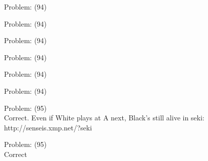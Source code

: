 \documentclass[11pt]{article}
\begin{document}
\begin{minipage}[t]{0.5\textwidth}
  {\centering
  
Problem: (94)\\
  }
\end{minipage}
\begin{minipage}[t]{0.5\textwidth}
  {\centering
  
Problem: (94)\\
  }
\end{minipage}
\begin{minipage}[t]{0.5\textwidth}
  {\centering
  
Problem: (94)\\
  }
\end{minipage}
\begin{minipage}[t]{0.5\textwidth}
  {\centering
  
Problem: (94)\\
  }
\end{minipage}
\begin{minipage}[t]{0.5\textwidth}
  {\centering
  
Problem: (94)\\
  }
\end{minipage}
\begin{minipage}[t]{0.5\textwidth}
  {\centering
  
Problem: (94)\\
  }
\end{minipage}
\begin{minipage}[t]{0.5\textwidth}
  {\centering
  
Problem: (95)\\
Correct. Even if White plays at A next, Black's still alive in seki: http://senseis.xmp.net/?seki\\
  }
\end{minipage}
\begin{minipage}[t]{0.5\textwidth}
  {\centering
  
Problem: (95)\\
Correct\\
  }
\end{minipage}
\end{document}
